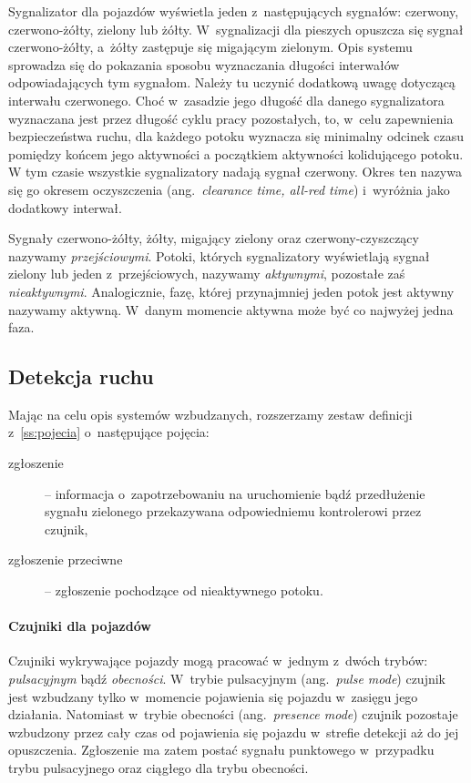 \documentclass{pracamgr}
\newcommand{\ang}[1]{(ang.~\emph{#1})}
\theoremstyle{plain}
\begin{document}
Sygnalizator dla pojazdów wyświetla jeden z~następujących sygnałów:
czerwony, czerwono-żółty, zielony lub żółty. W~sygnalizacji dla
pieszych opuszcza się sygnał czerwono-żółty, a~żółty zastępuje się
migającym zielonym. Opis systemu sprowadza się do pokazania sposobu
wyznaczania długości interwałów odpowiadających tym sygnałom. Należy
tu uczynić dodatkową uwagę dotyczącą interwału czerwonego. Choć w~zasadzie jego
długość dla danego sygnalizatora wyznaczana jest przez długość cyklu
pracy pozostałych, to, w~celu zapewnienia bezpieczeństwa ruchu, dla
każdego potoku wyznacza się minimalny odcinek czasu pomiędzy końcem
jego aktywności a początkiem aktywności kolidującego potoku. W tym
czasie wszystkie sygnalizatory nadają sygnał czerwony. Okres ten
nazywa się go okresem oczyszczenia \ang{clearance time, all-red time}
i~wyróżnia jako dodatkowy interwał.

Sygnały czerwono-żółty, żółty, migający zielony oraz
czerwony-czyszczący nazywamy \emph{przejściowymi}. Potoki, których
sygnalizatory wyświetlają sygnał zielony lub jeden z~przejściowych,
nazywamy \emph{aktywnymi}, pozostałe zaś
\emph{nieaktywnymi}. Analogicznie, fazę, której przynajmniej jeden
potok jest aktywny nazywamy aktywną. W~danym momencie aktywna może być
co najwyżej jedna faza.

\subsection{Detekcja ruchu}
\label{ss:detekcja} Mając na celu opis systemów wzbudzanych,
rozszerzamy zestaw definicji z~\ref{ss:pojecia} o~następujące
pojęcia:
\begin{description}
  \item[zgłoszenie] -- informacja o~zapotrzebowaniu na uruchomienie
  bądź przedłużenie sygnału zielonego przekazywana odpowiedniemu
  kontrolerowi przez czujnik,
  \item[zgłoszenie przeciwne] -- zgłoszenie pochodzące od nieaktywnego
  potoku.
\end{description}

\paragraph{Czujniki dla pojazdów} Czujniki wykrywające pojazdy mogą
pracować w~jednym z~dwóch trybów: \emph{pulsacyjnym} bądź
\emph{obecności}.  W~trybie pulsacyjnym \ang{pulse mode} czujnik jest
wzbudzany tylko w~momencie pojawienia się pojazdu w~zasięgu jego
działania.  Natomiast w~trybie obecności \ang{presence mode} czujnik
pozostaje wzbudzony przez cały czas od pojawienia się pojazdu
w~strefie detekcji aż do jej opuszczenia. Zgłoszenie ma zatem postać
sygnału punktowego w~przypadku trybu pulsacyjnego oraz ciągłego dla
trybu obecności.
\end{document}
